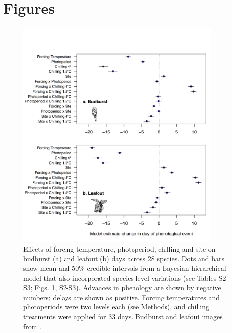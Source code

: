 \documentclass[11pt]{article}
\begin{document}




\newpage
\section*{Figures}




\begin{figure}[h!]
\centering
\noindent \includegraphics[width=0.9\textwidth]{images/Fig1_bb_lo.png}
\caption{Effects of forcing temperature, photoperiod, chilling and site on budburst (a) and leafout (b) days across 28 species. Dots and bars show mean and 50\% credible intervals from a Bayesian hierarchical model that also incorporated species-level variations (see Tables S2-S3; Figs. 1, S2-S3). Advances in phenology are shown by negative numbers; delays are shown as positive. Forcing temperatures and photoperiods were two levels each (see Methods), and chilling treatments were applied for 33 days. Budburst and leafout images from \citet{Finn:2007}.}
\label{fig:maineff}
\end{figure}
\end{document}
